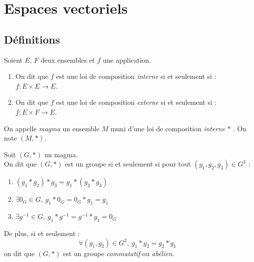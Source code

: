 \chapter{Espaces vectoriels}\label{chap:espaces_vectoriels}

\section{Définitions}
\begin{definition}
	Soient $E$, $F$ deux ensembles et $f$ une application.
	\begin{enumerate}
		\item On dit que $f$ est une loi de composition \emph{interne} si et seulement si : $f : E \times E \to E$.
		\item On dit que $f$ est une loi de composition \emph{externe} si et seulement si : $f : E \times F \to E$.
	\end{enumerate}
\end{definition}

\begin{definition}[Magma]
	On appelle \emph{magma} un ensemble $M$ muni d'une loi de composition \emph{interne} \og $*$ \fg. On note $(M, *)$.
\end{definition}

\begin{definition}[Groupe]
	Soit $(G, *)$ un magma.
	\\ 
	On dit que $(G, *)$ est un groupe si et seulement si pour tout $(g_1, g_2, g_3) \in G^3$ : 
    \begin{multicols}{2}
    	\begin{enumerate}
    		\item $(g_1 * g_2) * g_3 = g_1 * (g_2 * g_3)$
    		\item $\exists 0_G \in G,\ g_1 * 0_G = 0_G * g_1 = g_1$
    		\item $\exists g^{-1} \in G,\ g_1 * g^{-1} = g^{-1} * g_1 = 0_G$
    	\end{enumerate}
    \end{multicols}
    \noindent De plus, si et seulement :
    \[ \forall (g_1, g_2) \in G^2,\ g_1 * g_2 = g_2* g_1 \]
    on dit que $(G, *)$ est un groupe \emph{commutatif} ou \emph{abélien}.
\end{definition}

